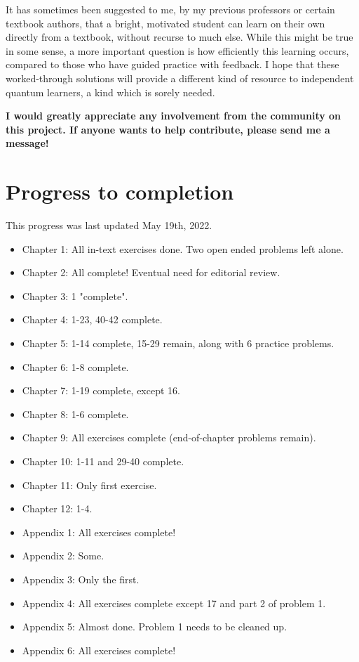 \documentclass{book}
\begin{document}
It has sometimes been suggested to me, by my previous professors or certain textbook authors, that a bright, motivated student can learn on their own directly from a textbook, without recurse to much else. While this might be true in some sense, a more important question is how efficiently this learning occurs, compared to those who have guided practice with feedback. I hope that these worked-through solutions will provide a different kind of resource to independent quantum learners, a kind which is sorely needed.

\textbf{I would greatly appreciate any involvement from the community on this project. If anyone wants to help contribute, please send me a message!}

\section{Progress to completion}

This progress was last updated May 19th, 2022.

\begin{itemize}
    \item Chapter 1: All in-text exercises done. Two open ended problems left alone.
    \item Chapter 2: All complete! Eventual need for editorial review.
    \item Chapter 3: 1 "complete".
    \item Chapter 4: 1-23, 40-42 complete.
    \item Chapter 5: 1-14 complete, 15-29 remain, along with 6 practice problems.
    \item Chapter 6: 1-8 complete.
    \item Chapter 7: 1-19 complete, except 16.
    \item Chapter 8: 1-6 complete.
    \item Chapter 9: All exercises complete (end-of-chapter problems remain).
    \item Chapter 10: 1-11 and 29-40 complete.
    \item Chapter 11: Only first exercise.
    \item Chapter 12: 1-4.
    \item Appendix 1: All exercises complete!
    \item Appendix 2: Some.
    \item Appendix 3: Only the first.
    \item Appendix 4: All exercises complete except 17 and part 2 of problem 1.
    \item Appendix 5: Almost done. Problem 1 needs to be cleaned up. 
    \item Appendix 6: All exercises complete!
\end{itemize}
\end{document}
